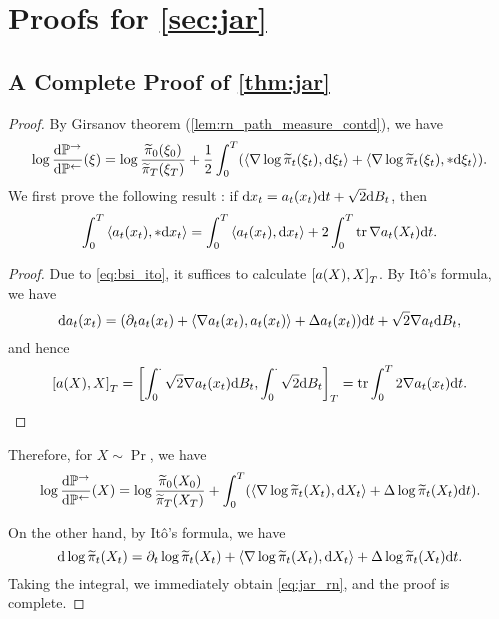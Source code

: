 \section{Proofs for \cref{sec:jar}}
\subsection{A Complete Proof of \cref{thm:jar}}
\label{prf:thm:jar}

\begin{proof}
By Girsanov theorem (\cref{lem:rn_path_measure_contd}), we have
$$\log\frac{\mathrm{d}\mathbb{P}^\to}{\mathrm{d}\mathbb{P}^\gets}(\xi)=\log\frac{\widetilde{\pi}_0(\xi_0)}{\widetilde{\pi}_T(\xi_T)}+\frac{1}{2}\int_0^T(\left\langle\nabla\log\widetilde{\pi}_t(\xi_t),\mathrm{d}\xi_t\right\rangle+\left\langle\nabla\log\widetilde{\pi}_t(\xi_t),*\mathrm{d}\xi_t\right\rangle).$$
We first prove the following result \citep[Eq. (15)]{vargas2024transport}: if $\mathrm{d} x_t=a_t(x_t)\mathrm{d} t+\sqrt{2}\mathrm{d} B_t$, then 
$$\int_0^T\left\langle a_t(x_t),*\mathrm{d} x_t\right\rangle=\int_0^T\left\langle a_t(x_t),\mathrm{d} x_t\right\rangle+2\int_0^T\operatorname{tr}\nabla a_t(X_t)\mathrm{d} t.$$

\begin{proof}
    Due to \cref{eq:bsi_ito}, it suffices to calculate $\left[a(X),X\right]_T$. By It\^o's formula, we have
    $$\mathrm{d} a_t(x_t)=(\partial_ta_t(x_t)+\left\langle\nabla a_t(x_t),a_t(x_t)\right\rangle+\Delta a_t(x_t))\mathrm{d} t+\sqrt{2}\nabla a_t\mathrm{d} B_t,$$
    and hence
    $$\left[a(X),X\right]_T=\left[\int_0^\cdot\sqrt{2}\nabla a_t(x_t)\mathrm{d} B_t,\int_0^\cdot\sqrt{2}\mathrm{d} B_t\right]_T=\operatorname{tr}\int_0^T2\nabla a_t(x_t)\mathrm{d} t.$$
\end{proof}

Therefore, for $X\sim\Pr$, we have
$$\log\frac{\mathrm{d}\mathbb{P}^\to}{\mathrm{d}\mathbb{P}^\gets}(X)=\log\frac{\widetilde{\pi}_0(X_0)}{\widetilde{\pi}_T(X_T)}+\int_0^T(\left\langle\nabla\log\widetilde{\pi}_t(X_t),\mathrm{d} X_t\right\rangle+\Delta\log\widetilde{\pi}_t(X_t)\mathrm{d} t).$$

On the other hand, by It\^o's formula, we have
$$\mathrm{d}\log\widetilde{\pi}_t(X_t)=\partial_t\log\widetilde{\pi}_t(X_t)+\left\langle\nabla\log\widetilde{\pi}_t(X_t),\mathrm{d} X_t\right\rangle+\Delta\log\widetilde{\pi}_t(X_t)\mathrm{d} t.$$
Taking the integral, we immediately obtain \cref{eq:jar_rn}, and the proof is complete.
\end{proof}

